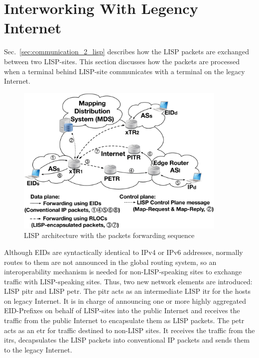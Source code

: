 \section{Interworking With Legency Internet}
\label{sec:background_Interworking}

Sec.~\ref{sec:communication_2_lisp} describes how the LISP packets are exchanged between two LISP-sites. This section discusses how the packets are processed when a terminal behind LISP-site communicates with a terminal on the legacy Internet.

\begin{figure}[!t]
	\centering
	\includegraphics[width=0.9\textwidth]{Pics/LISP_archi_PxTR.eps}
	\caption{LISP architecture with the packets forwarding sequence}
	\label{LISP_archi_PxTR}
\end{figure}
Although EIDs are syntactically identical to IPv4 or IPv6 addresses, normally routes to them are not announced in the global routing system, so an interoperability mechanism is needed for non-LISP-speaking sites to exchange traffic with LISP-speaking sites. Thus, two new network elements are introduced: LISP \acrfull{pitr} and LISP \acrfull{petr}. The \acrshort{pitr} acts as an intermediate LISP \acrshort{itr} for the hosts on legacy Internet. It is in charge of announcing one or more highly aggregated EID-Prefixes on behalf of LISP-sites into the public Internet and receives the traffic from the public Internet to encapsulate them as LISP packets. The \acrshort{petr} acts as an \acrshort{etr} for traffic destined to non-LISP sites. It receives the traffic from the \acrshort{itr}s, decapsulates the LISP packets into conventional IP packets and sends them to the legacy Internet.

